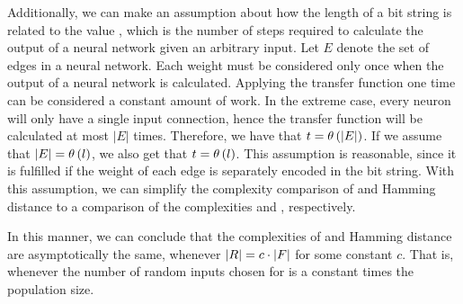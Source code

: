 Additionally, we can make an assumption about how the length of a bit string \bitstringl{} is related to the value \timet, which is the number of steps required to calculate the output of a neural network given an arbitrary input. Let $E$ denote the set of edges in a neural network. Each weight must be considered only once when the output of a neural network is calculated. Applying the transfer function one time can be considered a constant amount of work. In the extreme case, every neuron will only have a single input connection, hence the transfer function will be calculated at most $|E|$ times. Therefore, we have that $t = \theta\left(\lvert E\rvert\right)$. If we assume that $\lvert E\rvert = \theta\left(l\right)$, we also get that $t = \theta\left(l\right)$. This assumption is reasonable, since it is fulfilled if the weight of each edge is separately encoded in the bit string. With this assumption, we can simplify the complexity comparison of \dia{} and Hamming distance to a comparison of the complexities \bigO{\ransetl} and \bigO{\indsetl}, respectively.

In this manner, we can conclude that the complexities of \dia{} and Hamming distance are asymptotically the same, whenever $\lvert R\rvert = c \cdot \lvert F\rvert$ for some constant $c$. That is, whenever the number of random inputs chosen for \dia{} is a constant times the population size.
